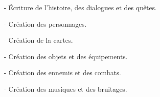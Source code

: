 

- Écriture de l'histoire, des dialogues et des quêtes.

- Création des personnages.

- Création de la cartes.

- Création des objets et des équipements.

- Création des ennemis et des combats.

- Création des musiques et des bruitages.